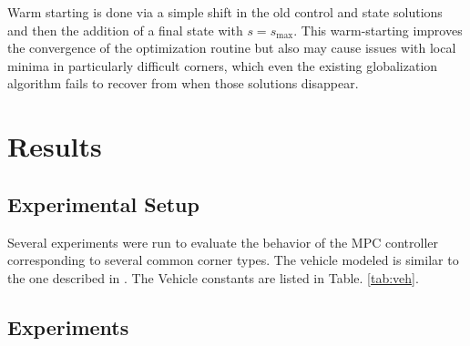 \documentclass[conference,11pt]{IEEEtran}
\begin{document}
Warm starting is done via a simple shift in the old control and state solutions and then the addition of a final state with $s = s_{\mathrm{max}}$. This warm-starting improves the convergence
of the optimization routine but also may cause issues with local minima in particularly difficult corners, which even the existing globalization algorithm fails to recover from when those solutions
disappear.

\section{Results}
\subsection{Experimental Setup}

Several experiments were run to evaluate the behavior of the MPC controller corresponding to several common corner types. The vehicle modeled is similar to the one described in \cite{LOT20147559}.
The Vehicle constants are listed in Table. \ref{tab:veh}.

\subsection{Experiments}
\end{document}
